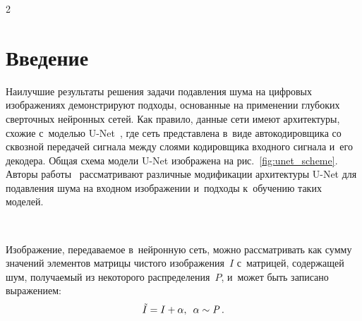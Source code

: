 
  



\thispagestyle{headings}

\begin{multicols}{2}

\label{st\stat}

\section{Введение}



Наилучшие результаты решения задачи по\-дав\-ле\-ния шума на цифровых изображениях 
демонстрируют подходы, основанные на применении глубоких сверточных нейронных 
сетей. Как правило, данные сети имеют архитектуры, схожие с~мо\-делью 
U-Net~\cite{UNET_ORIGINAL}, где сеть представлена в~виде автокодировщика со 
сквозной передачей сигнала между слоями кодировщика входного сигнала и~его 
декодера. Общая схема модели U-Net изображена на рис.~\ref{fig:unet_scheme}. 
Авторы работы~\cite{UNETS_COMPARISON} рассматривают различные модификации 
архитектуры U-Net для подавления шума на входном изображении и~подходы 
к~обуче\-нию таких моделей.

\begin{figure*} %
 \vspace*{1pt}
      \begin{center}
     \mbox{%
\epsfxsize=163mm 
}
\end{center}
\vspace*{-6pt}
    \label{fig:unet_scheme}
\end{figure*}

Изображение, передаваемое в~нейронную сеть, можно рассматривать как сумму 
значений элементов матрицы чистого изображения~$I$ с~матрицей, содержащей шум, 
получаемый из некоторого распределения~$\mathit{P}$, и~может быть записано 
выражением:
\begin{equation*}
\label{eq:input_image_def}
    \tilde{I} = I + \alpha,\enskip \alpha \sim \mathit{P}\,.
\end{equation*}


\end{multicols}
